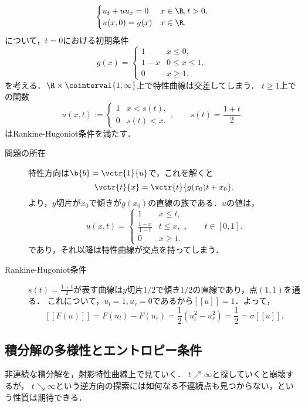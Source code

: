 \documentclass[uplatex,dvipdfmx]{jsreport}
\begin{document}
\begin{example}[Burgers方程式の衝撃波]
    \[\begin{cases}
        u_t+uu_x=0&x\in\R,t>0,\\
        u(x,0)=g(x)&x\in\R.
    \end{cases}\]
    について，$t=0$における初期条件
    \[g(x)=\begin{cases}
        1&x\le 0,\\
        1-x&0\le x\le 1,\\
        0&x\ge1.
    \end{cases}\]
    を考える．$\R\times\cointerval{1,\infty}$上で特性曲線は交差してしまう．
    $t\ge1$上での関数
    \[u(x,t):=\begin{cases}
        1&x<s(t),\\
        0&s(t)<x.
    \end{cases},\qquad s(t)=\frac{1+t}{2}.\]
    はRankine-Hugoniot条件を満たす．
\end{example}
\begin{Proof}\mbox{}
    \begin{description}
        \item[問題の所在] 特性方向は$\b{b}=\vctr{1}{u}$で，これを解くと
        \[\vctr{t}{x}=\vctr{t}{g(x_0)t+x_0}.\]
        より，$y$切片が$x_0$で傾きが$g(x_0)$の直線の族である．$u$の値は，
        \[u(x,t)=\begin{cases}
            1&x\le t,\\
            \frac{1-x}{1-t}&t\le x,\\
            0&x\ge1.
        \end{cases},\qquad t\in[0,1].\]
        であり，それ以降は特性曲線が交点を持ってしまう．
        \item[Rankine-Hugoniot条件] $s(t)=\frac{1+t}{2}$が表す曲線は$y$切片$1/2$で傾き$1/2$の直線であり，点$(1,1)$を通る．
        これについて，$u_l=1,u_r=0$であるから$[[u]]=1$．よって，
        \[[[F(u)]]=F(u_l)-F(u_r)=\frac{1}{2}(u_l^2-u_r^2)=\frac{1}{2}=\sigma[[u]].\]
    \end{description}
\end{Proof}

\subsection{積分解の多様性とエントロピー条件}

\begin{tcolorbox}[colframe=ForestGreen, colback=ForestGreen!10!white,breakable,colbacktitle=ForestGreen!40!white,coltitle=black,fonttitle=\bfseries\sffamily,
title=]
    非連続な積分解を，射影特性曲線上で見ていく．
    $t\nearrow\infty$と探していくと崩壊するが，
    $t\searrow\infty$という逆方向の探索には如何なる不連続点も見つからない，という性質は期待できる．
\end{tcolorbox}
\end{document}
